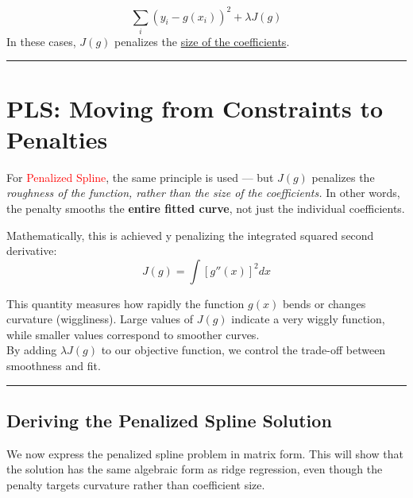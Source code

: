 \documentclass[
  letterpaper,
  DIV=11,
  numbers=noendperiod]{scrreprt}
\begin{document}
\[
\sum_i (y_i - g(x_i))^2 + \lambda J(g)
\] In these cases, \(J(g)\) penalizes the \ul{size of the coefficients}.

\begin{center}\rule{0.5\linewidth}{0.5pt}\end{center}

\hypertarget{pls-moving-from-constraints-to-penalties}{%
\section*{PLS: Moving from Constraints to
Penalties}\label{pls-moving-from-constraints-to-penalties}}


For \textcolor{red}{Penalized Spline}, the same principle is used ---
but \(J(g)\) penalizes the \emph{roughness of the function, rather than
the size of the coefficients.} In other words, the penalty smooths the
\textbf{entire fitted curve}, not just the individual coefficients.

Mathematically, this is achieved y penalizing the integrated squared
second derivative:\\
\[
J(g) = \int [g''(x)]^2 dx
\]

This quantity measures how rapidly the function \(g(x)\) bends or
changes curvature (wiggliness). Large values of \(J(g)\) indicate a very
wiggly function, while smaller values correspond to smoother curves.\\
By adding \(\lambda J(g)\) to our objective function, we control the
trade-off between smoothness and fit.

\begin{center}\rule{0.5\linewidth}{0.5pt}\end{center}

\hypertarget{deriving-the-penalized-spline-solution}{%
\subsection*{Deriving the Penalized Spline
Solution}\label{deriving-the-penalized-spline-solution}}

We now express the penalized spline problem in matrix form. This will
show that the solution has the same algebraic form as ridge regression,
even though the penalty targets curvature rather than coefficient size.
\end{document}
